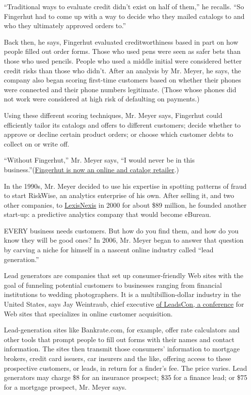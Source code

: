 ``Traditional ways to evaluate credit didn't exist on half of them,'' he
recalls. ``So Fingerhut had to come up with a way to decide who they
mailed catalogs to and who they ultimately approved orders to.''

Back then, he says, Fingerhut evaluated creditworthiness based in part
on how people filled out order forms. Those who used pens were seen as
safer bets than those who used pencils. People who used a middle initial
were considered better credit risks than those who didn't. After an
analysis by Mr. Meyer, he says, the company also began scoring
first-time customers based on whether their phones were connected and
their phone numbers legitimate. (Those whose phones did not work were
considered at high risk of defaulting on payments.)

Using these different scoring techniques, Mr. Meyer says, Fingerhut
could efficiently tailor its catalogs and offers to different customers;
decide whether to approve or decline certain product orders; or choose
which customer debts to collect on or write off.

``Without Fingerhut,'' Mr. Meyer says, ``I would never be in this
business.''(\href{http://www.fingerhut.com/}{Fingerhut is now an online
and catalog retailer}.)

In the 1990s, Mr. Meyer decided to use his expertise in spotting
patterns of fraud to start RiskWise, an analytics enterprise of his own.
After selling it, and two other companies, to
\href{http://www.lexisnexis.com/en-us/home.page}{LexisNexis} in 2000 for
about \$89 million, he founded another start-up: a predictive analytics
company that would become eBureau.

EVERY business needs customers. But how do you find them, and how do you
know they will be good ones? In 2006, Mr. Meyer began to answer that
question by carving a niche for himself in a nascent online industry
called ``lead generation.''

Lead generators are companies that set up consumer-friendly Web sites
with the goal of funneling potential customers to businesses ranging
from financial institutions to wedding photographers. It is a
multibillion-dollar industry in the United States, says Jay Weintraub,
chief executive
\href{http://www.leadscon.com/?gclid=CK-3gtXB57ECFcHd4AodDXYAng}{of
LeadsCon, a conference} for Web sites that specializes in online
customer acquisition.

Lead-generation sites like Bankrate.com, for example, offer rate
calculators and other tools that prompt people to fill out forms with
their names and contact information. The sites then transmit those
consumers' information to mortgage brokers, credit card issuers, car
insurers and the like, offering access to these prospective customers,
or leads, in return for a finder's fee. The price varies. Lead
generators may charge \$8 for an insurance prospect; \$35 for a finance
lead; or \$75 for a mortgage prospect, Mr. Meyer says.

